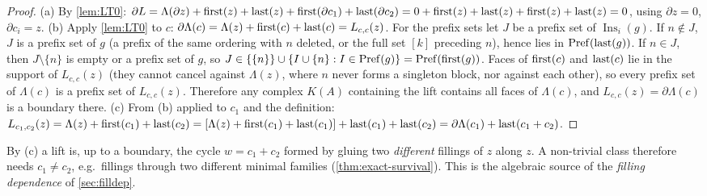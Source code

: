 \begin{proof}
(a) By \cref{lem:LT0}: $\partial L=\Lambda(\partial z)+\mathrm{first}(z)+\mathrm{last}(z)+\mathrm{first}(\partial c_1)+\mathrm{last}(\partial c_2)=0+\mathrm{first}(z)+\mathrm{last}(z)+\mathrm{first}(z)+\mathrm{last}(z)=0$, using $\partial z=0$, $\partial c_i=z$.
(b) Apply \cref{lem:LT0} to $c$: $\partial\Lambda(c)=\Lambda(z)+\mathrm{first}(c)+\mathrm{last}(c)=L_{c,c}(z)$. For the prefix sets let $J$ be a prefix set of $\operatorname{Ins}_i(g)$. If $n\notin J$, $J$ is a prefix set of $g$ (a prefix of the same ordering with $n$ deleted, or the full set $[k]$ preceding $n$), hence lies in $\mathrm{Pref}(\mathrm{last}(g))$. If $n\in J$, then $J\setminus\{n\}$ is empty or a prefix set of $g$, so $J\in\{\{n\}\}\cup\{I\cup\{n\}:I\in\mathrm{Pref}(g)\}=\mathrm{Pref}(\mathrm{first}(g))$. Faces of $\mathrm{first}(c)$ and $\mathrm{last}(c)$ lie in the support of $L_{c,c}(z)$ (they cannot cancel against $\Lambda(z)$, where $n$ never forms a singleton block, nor against each other), so every prefix set of $\Lambda(c)$ is a prefix set of $L_{c,c}(z)$. Therefore any complex $K(A)$ containing the lift contains all faces of $\Lambda(c)$, and $L_{c,c}(z)=\partial\Lambda(c)$ is a boundary there.
(c) From (b) applied to $c_1$ and the definition: $L_{c_1,c_2}(z)=\Lambda(z)+\mathrm{first}(c_1)+\mathrm{last}(c_2)=[\Lambda(z)+\mathrm{first}(c_1)+\mathrm{last}(c_1)]+\mathrm{last}(c_1)+\mathrm{last}(c_2)=\partial\Lambda(c_1)+\mathrm{last}(c_1+c_2)$.
\end{proof}
\begin{remark}
By (c) a lift is, up to a boundary, the cycle $w=c_1+c_2$ formed by gluing two \emph{different} fillings of $z$ along $z$. A non-trivial class therefore needs $c_1\ne c_2$, e.g.\ fillings through two different minimal families (\cref{thm:exact-survival}). This is the algebraic source of the \emph{filling dependence} of \cref{sec:filldep}.
\end{remark}

